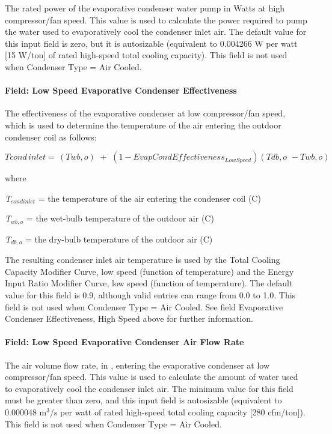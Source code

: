 The rated power of the evaporative condenser water pump in Watts at high compressor/fan speed. This value is used to calculate the power required to pump the water used to evaporatively cool the condenser inlet air. The default value for this input field is zero, but it is autosizable (equivalent to 0.004266 W per watt {[}15 W/ton{]} of rated high-speed total cooling capacity). This field is not used when Condenser Type = Air Cooled.

\paragraph{Field: Low Speed Evaporative Condenser Effectiveness}\label{field-low-speed-evaporative-condenser-effectiveness}

The effectiveness of the evaporative condenser at low compressor/fan speed, which is used to determine the temperature of the air entering the outdoor condenser coil as follows:

\begin{equation}
Tcond\,inlet = \,\left( {Twb,o} \right)\,\, + \,\,\left( {1 - EvapCondEffectivenes{s_{LowSpeed}}} \right)\left( {Tdb,o\,\, - Twb,o} \right)
\end{equation}

where

\emph{T\(_{cond inlet}\)} = the temperature of the air entering the condenser coil (C)

\emph{T\(_{wb,o}\)} = the wet-bulb temperature of the outdoor air (C)

\emph{T\(_{db,o}\)} = the dry-bulb temperature of the outdoor air (C)

The resulting condenser inlet air temperature is used by the Total Cooling Capacity Modifier Curve, low speed (function of temperature) and the Energy Input Ratio Modifier Curve, low speed (function of temperature). The default value for this field is 0.9, although valid entries can range from 0.0 to 1.0. This field is not used when Condenser Type = Air Cooled. See field Evaporative Condenser Effectiveness, High Speed above for further information.

\paragraph{Field: Low Speed Evaporative Condenser Air Flow Rate}\label{field-low-speed-evaporative-condenser-air-flow-rate}

The air volume flow rate, in \si{\volumeFlowRate}, entering the evaporative condenser at low compressor/fan speed. This value is used to calculate the amount of water used to evaporatively cool the condenser inlet air. The minimum value for this field must be greater than zero, and this input field is autosizable (equivalent to 0.000048 m\(^{3}\)/s per watt of rated high-speed total cooling capacity {[}280 cfm/ton{]}). This field is not used when Condenser Type = Air Cooled.

